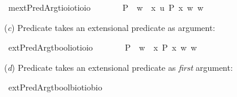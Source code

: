 \begin{isabellebody}
\isamarkupfalse%
\ mextPredArg{\isacharcolon}{\isacharcolon}{\isachardoublequoteopen}{\isacharparenleft}{\isacharparenleft}{\isacharprime}t{\isasymRightarrow}io{\isacharparenright}{\isasymRightarrow}io{\isacharparenright}{\isasymRightarrow}{\isacharparenleft}{\isacharprime}t{\isasymRightarrow}io{\isacharparenright}{\isasymRightarrow}io{\isachardoublequoteclose}\ {\isacharparenleft}\ {\isachardoublequoteopen}\isactrlbold {\isasymdown}{\isachardoublequoteclose}\ {}{}{\isacharparenright}\isanewline
\ \ \ {\isachardoublequoteopen}{\isasymphi}\ \isactrlbold {\isasymdown}P\ {\isasymequiv}\ {\isasymlambda}w{\isachardot}\ {\isasymphi}\ {\isacharparenleft}{\isasymlambda}x\ u{\isachardot}\ P\ x\ w{\isacharparenright}\ w{\isachardoublequoteclose}%
\begin{isamarkuptext}%
(\emph{c}) Predicate \isa{{\isasymphi}} takes an extensional predicate as argument:%
\end{isamarkuptext}\isamarkuptrue%
\isamarkupfalse%
\ extPredArg{\isacharcolon}{\isacharcolon}{\isachardoublequoteopen}{\isacharparenleft}{\isacharparenleft}{\isacharprime}t{\isasymRightarrow}bool{\isacharparenright}{\isasymRightarrow}io{\isacharparenright}{\isasymRightarrow}{\isacharparenleft}{\isacharprime}t{\isasymRightarrow}io{\isacharparenright}{\isasymRightarrow}io{\isachardoublequoteclose}\ {\isacharparenleft}\ {\isachardoublequoteopen}{\isasymdown}{\isachardoublequoteclose}\ {}{}{\isacharparenright}\isanewline
\ \ \ {\isachardoublequoteopen}{\isasymphi}\ {\isasymdown}P\ {\isasymequiv}\ {\isasymlambda}w{\isachardot}\ {\isasymphi}\ {\isacharparenleft}{\isasymlambda}x{\isachardot}\ P\ x\ w{\isacharparenright}\ w{\isachardoublequoteclose}%
\begin{isamarkuptext}%
(\emph{d}) Predicate \isa{{\isasymphi}} takes an extensional predicate as \emph{first} argument:%
\end{isamarkuptext}\isamarkuptrue%
\isamarkupfalse%
\ extPredArg{}{\isacharcolon}{\isacharcolon}{\isachardoublequoteopen}{\isacharparenleft}{\isacharparenleft}{\isacharprime}t{\isasymRightarrow}bool{\isacharparenright}{\isasymRightarrow}{\isacharprime}b{\isasymRightarrow}io{\isacharparenright}{\isasymRightarrow}{\isacharparenleft}{\isacharprime}t{\isasymRightarrow}io{\isacharparenright}{\isasymRightarrow}{\isacharprime}b{\isasymRightarrow}io{\isachardoublequoteclose}\ {\isacharparenleft}\ {\isachardoublequoteopen}{\isasymdown}\ {}{}{\isacharparenright}\isanewline

\end{isabellebody}
